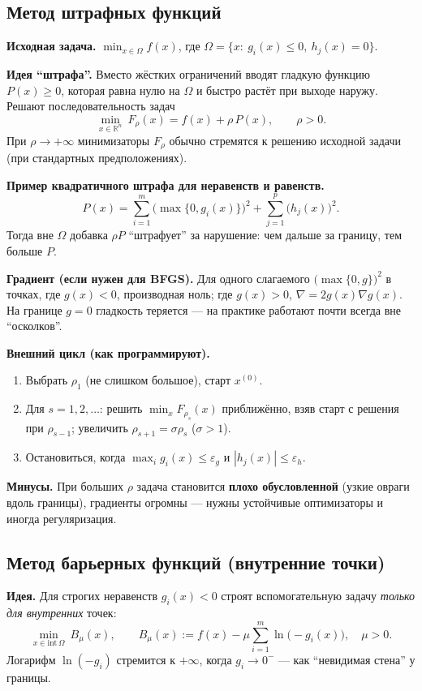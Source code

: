 \documentclass[12pt,a4paper]{article}
\newcommand{\R}{\mathbb{R}}
\newcommand{\grad}{\nabla}
\begin{document}
\subsection{Метод штрафных функций}
\textbf{Исходная задача.} \(\min_{x\in\Omega} f(x)\), где \(\Omega=\{x:\ g_i(x)\le0,\ h_j(x)=0\}\).

\textbf{Идея ``штрафа''.} Вместо жёстких ограничений вводят гладкую функцию \(P(x)\ge0\), которая равна нулю на \(\Omega\) и быстро растёт при выходе наружу. Решают последовательность задач
\[
  \min_{x\in\R^n}\ F_\rho(x)=f(x)+\rho\,P(x),\qquad \rho>0.
\]
При \(\rho\to+\infty\) минимизаторы \(F_\rho\) обычно стремятся к решению исходной задачи (при стандартных предположениях).

\textbf{Пример квадратичного штрафа для неравенств и равенств.}
\[
  P(x)=\sum_{i=1}^m \bigl(\max\{0,g_i(x)\}\bigr)^2+\sum_{j=1}^p \bigl(h_j(x)\bigr)^2.
\]
Тогда вне \(\Omega\) добавка \(\rho P\) ``штрафует'' за нарушение: чем дальше за границу, тем больше \(P\).

\textbf{Градиент (если нужен для BFGS).} Для одного слагаемого \(\bigl(\max\{0,g\}\bigr)^2\) в точках, где \(g(x)<0\), производная ноль; где \(g(x)>0\), \(\nabla=2g(x)\grad g(x)\). На границе \(g=0\) гладкость теряется --- на практике работают почти всегда вне ``осколков''.

\textbf{Внешний цикл (как программируют).}
\begin{enumerate}
  \item Выбрать \(\rho_1\) (не слишком большое), старт \(x^{(0)}\).
  \item Для \(s=1,2,\ldots\): решить \(\min_x F_{\rho_s}(x)\) приближённо, взяв старт с решения при \(\rho_{s-1}\); увеличить \(\rho_{s+1}=\sigma\rho_s\) (\(\sigma>1\)).
  \item Остановиться, когда \(\max_i g_i(x)\le\varepsilon_g\) и \(|h_j(x)|\le\varepsilon_h\).
\end{enumerate}

\textbf{Минусы.} При больших \(\rho\) задача становится \textbf{плохо обусловленной} (узкие овраги вдоль границы), градиенты огромны --- нужны устойчивые оптимизаторы и иногда регуляризация.

\subsection{Метод барьерных функций (внутренние точки)}
\textbf{Идея.} Для строгих неравенств \(g_i(x)<0\) строят вспомогательную задачу \emph{только для внутренних} точек:
\[
  \min_{x\in\mathrm{int}\,\Omega}\ B_\mu(x),\qquad B_\mu(x):=f(x)-\mu\sum_{i=1}^m \ln\bigl(-g_i(x)\bigr),\quad \mu>0.
\]
Логарифм \(\ln(-g_i)\) стремится к \(+\infty\), когда \(g_i\to0^{-}\) --- как ``невидимая стена'' у границы.
\end{document}
